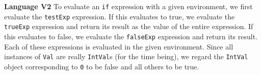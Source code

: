 \begin{minipage}[t]{\sw}
\slidenumber
\LARGE
{\bf Language V2}\exx
To evaluate an \verb'if' expression with a given environment,
we first evaluate the \verb'testExp' expression.
If this evaluates to true,
we evaluate the \verb'trueExp' expression
and return its result as the value of the entire expression.
If this evaluates to false,
we evaluate the \verb'falseExp' expression
and return its result.
Each of these expressions is evaluated
in the given environment.\exx
Since all instances of \verb'Val' are really \verb'IntVal's
(for the time being),
we regard the \verb'IntVal' object corresponding to \verb'0'
to be false and all others to be true.
\end{minipage}
\clearpage
